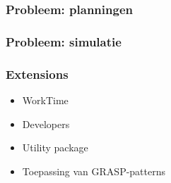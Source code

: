 \documentclass{beamer}
\begin{document}
\begin{frame}
\frametitle {Probleem: planningen}



\end{frame}
\begin{frame}
\frametitle {Probleem: simulatie}



\end{frame}




%

\begin{frame}
\frametitle{Extensions}
\begin{itemize}
\item WorkTime\newline
\newline
\item Developers\newline
\newline
\item Utility package\newline
\newline
\item Toepassing van GRASP-patterns
\end{itemize}

\end{frame}

%
\end{document}
